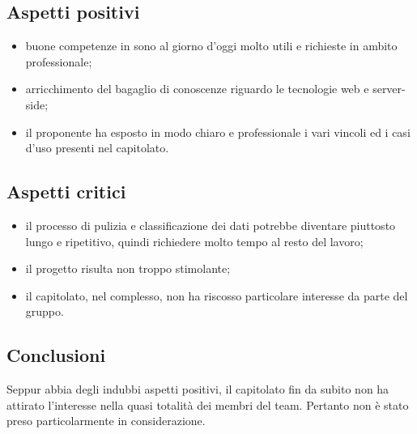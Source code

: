 \subsection{Aspetti positivi}
\begin{itemize}
\item buone competenze in  sono al giorno d’oggi molto utili e richieste in ambito professionale;
\item arricchimento del bagaglio di conoscenze riguardo le tecnologie web e server-side;
\item il proponente ha esposto in modo chiaro e professionale i vari vincoli ed i casi d'uso presenti nel capitolato.
\end{itemize}
\subsection{Aspetti critici}
\begin{itemize}
\item il processo di pulizia e classificazione dei dati potrebbe diventare piuttosto lungo e ripetitivo, quindi richiedere molto tempo al resto del lavoro;
\item il progetto risulta non troppo stimolante;
\item il capitolato, nel complesso, non ha riscosso particolare interesse da parte del gruppo.
\end{itemize}
\subsection{Conclusioni}
Seppur abbia degli indubbi aspetti positivi, il capitolato fin da subito non ha attirato l'interesse nella quasi totalità dei membri del team. Pertanto non è stato preso particolarmente in considerazione.
